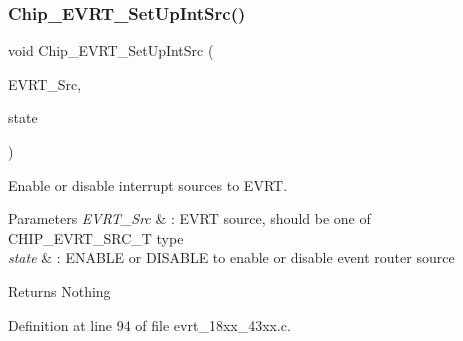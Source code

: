 \subsubsection{\texorpdfstring{Chip\+\_\+\+E\+V\+R\+T\+\_\+\+Set\+Up\+Int\+Src()}{Chip\_EVRT\_SetUpIntSrc()}}
{\footnotesize\ttfamily void Chip\+\_\+\+E\+V\+R\+T\+\_\+\+Set\+Up\+Int\+Src (\begin{DoxyParamCaption}\item[{\hyperlink{group___e_v_r_t__18_x_x__43_x_x_gaa43c01b5839b8ef001017d1d1150b16d}{C\+H\+I\+P\+\_\+\+E\+V\+R\+T\+\_\+\+S\+R\+C\+\_\+T}}]{E\+V\+R\+T\+\_\+\+Src,  }\item[{\hyperlink{group___l_p_c___types___public___types_gac9a7e9a35d2513ec15c3b537aaa4fba1}{Functional\+State}}]{state }\end{DoxyParamCaption})}



Enable or disable interrupt sources to E\+V\+RT. 


\begin{DoxyParams}{Parameters}
{\em E\+V\+R\+T\+\_\+\+Src} & \+: E\+V\+RT source, should be one of C\+H\+I\+P\+\_\+\+E\+V\+R\+T\+\_\+\+S\+R\+C\+\_\+T type \\
\hline
{\em state} & \+: E\+N\+A\+B\+LE or D\+I\+S\+A\+B\+LE to enable or disable event router source \\
\hline
\end{DoxyParams}
\begin{DoxyReturn}{Returns}
Nothing 
\end{DoxyReturn}


Definition at line 94 of file evrt\+\_\+18xx\+\_\+43xx.\+c.

